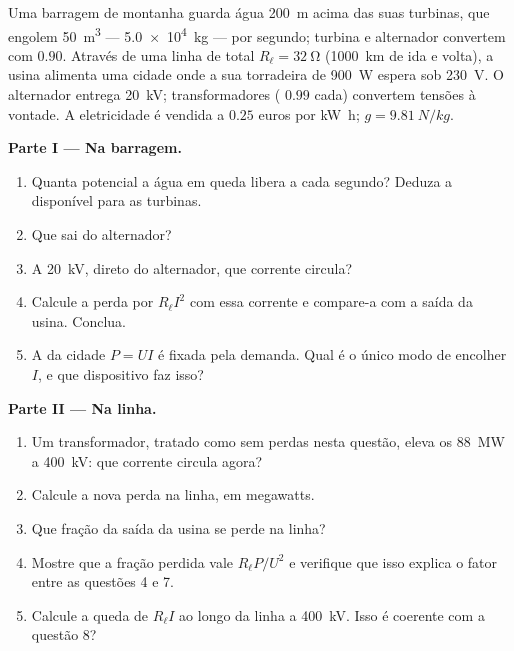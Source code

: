 \begin{problem}
\label{pb:g11:circuits-and-power:1}
Uma barragem de montanha guarda água \qty{200}{m} acima das suas
turbinas, que engolem \qty{50}{m^3} --- \qty{5.0e4}{kg} --- por segundo;
turbina e alternador convertem com  $0.90$. Através de uma
linha de  total $R_\ell = \qty{32}{\ohm}$ (\qty{1000}{km} de
ida e volta), a usina alimenta uma cidade onde a sua torradeira de
\qty{900}{W} espera sob \qty{230}{V}. O alternador entrega
\qty{20}{kV}; transformadores ( $0.99$ cada) convertem tensões
à vontade. A eletricidade é vendida a $0.25$ euros por \unit{kW.h};
$g = \qty{9.81}{N/kg}$.

\medskip
\noindent\textbf{Parte I --- Na barragem.}
\begin{enumerate}
  \item Quanta  potencial a água em queda libera a cada segundo?
        Deduza a  disponível para as turbinas.
  \item Que  sai do alternador?
  \item A \qty{20}{kV}, direto do alternador, que corrente circula?
  \item Calcule a perda por  $R_\ell I^2$ com essa corrente e
        compare-a com a saída da usina. Conclua.
  \item A  da cidade $P = UI$ é fixada pela demanda. Qual é o
        único modo de encolher $I$, e que dispositivo faz isso?
\end{enumerate}

\medskip
\noindent\textbf{Parte II --- Na linha.}
\begin{enumerate}[resume]
  \item Um transformador, tratado como sem perdas nesta questão, eleva os
        \qty{88}{MW} a \qty{400}{kV}: que corrente circula agora?
  \item Calcule a nova perda na linha, em megawatts.
  \item Que fração da saída da usina se perde na linha?
  \item Mostre que a fração perdida vale $R_\ell P/U^2$ e verifique que
        isso explica o fator entre as questões 4 e 7.
  \item Calcule a queda de  $R_\ell I$ ao longo da linha a
        \qty{400}{kV}. Isso é coerente com a questão 8?
\end{enumerate}


\end{problem}
